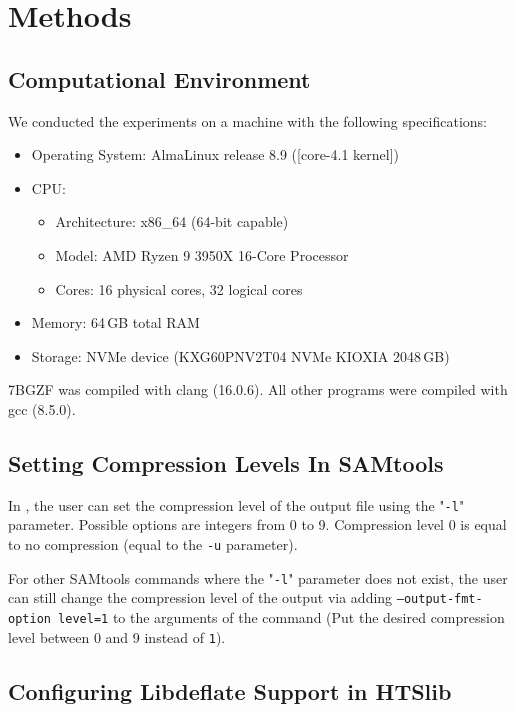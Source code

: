 \appendix
\appendixpage
\addappheadtotoc
\section{Methods}

\subsection{Computational Environment}
We conducted the experiments on a machine with the following specifications:
\begin{itemize}
    \item Operating System: AlmaLinux release 8.9 ([core-4.1 kernel])

    \item  CPU:
    \begin{itemize}
        \item Architecture: x86\_64 (64-bit capable)
        \item Model: AMD Ryzen 9 3950X 16-Core Processor  
        \item Cores: 16 physical cores, 32 logical cores
        
    \end{itemize}
    \item Memory: 64\,GB total RAM
    \item Storage: NVMe device (KXG60PNV2T04 NVMe KIOXIA 2048\,GB)
\end{itemize}
7BGZF was compiled with clang (16.0.6). All other programs were compiled with gcc (8.5.0).


\subsection{Setting Compression Levels In SAMtools}\label{methodeComp}
In \sort, the user can set the compression level of the output file using the "\texttt{-l}" parameter. Possible options are integers from 0 to 9. Compression level 0 is equal to no compression (equal to the \texttt{-u} parameter).

For other SAMtools commands where the "\texttt{-l}" parameter does not exist, the user can still change the compression level of the output via adding \texttt{--output-fmt-option level=1} to the arguments of the command (Put the desired compression level between 0 and 9 instead of \texttt{1}).

\subsection{Configuring Libdeflate Support in HTSlib} \label{turnLibdeflate}

